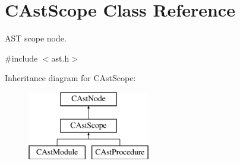 \hypertarget{classCAstScope}{\section{C\-Ast\-Scope Class Reference}
\label{classCAstScope}
}


A\-S\-T scope node.  




{\ttfamily \#include $<$ast.\-h$>$}

Inheritance diagram for C\-Ast\-Scope\-:\begin{figure}[H]
\begin{center}
\leavevmode
\includegraphics[height=3.000000cm]{classCAstScope}
\end{center}
\end{figure}
